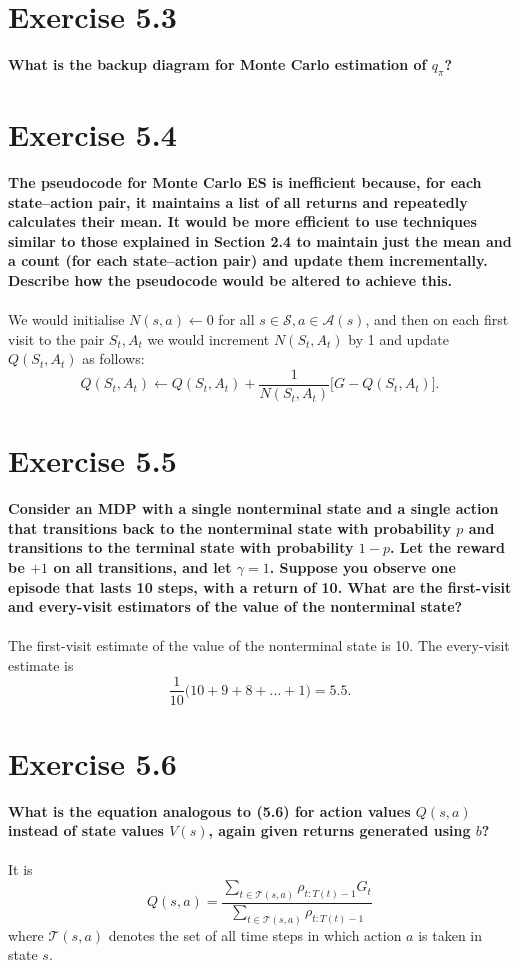 \documentclass[a4paper,11pt]{article}
\numberwithin{equation}{section}
\theoremstyle{remark}
\begin{document}
\section{Exercise 5.3}

\textbf{What is the backup diagram for Monte Carlo estimation of $q_\pi$?}

\section{Exercise 5.4}

\textbf{The pseudocode for Monte Carlo ES is inefficient because, for each state–action pair, it maintains a list of all returns and repeatedly calculates their mean. It would be more efficient to use techniques similar to those explained in Section 2.4 to maintain just the mean and a count (for each state–action pair) and update them incrementally. Describe how the pseudocode would be altered to achieve this.}
\\ \\
We would initialise $N(s, a) \gets 0$ for all $s \in \mathcal{S}, a \in \mathcal{A}(s)$, and then on each first visit to the pair $S_t, A_t$ we would increment $N(S_t, A_t)$ by 1 and update $Q(S_t, A_t)$ as follows:
\[
	Q(S_t, A_t) \gets Q(S_t, A_t) + \frac{1}{N(S_t, A_t)} \Big[G - Q(S_t, A_t)\Big].
\]

\section{Exercise 5.5}

\textbf{Consider an MDP with a single nonterminal state and a single action that transitions back to the nonterminal state with probability $p$ and transitions to the terminal state with probability $1 - p$. Let the reward be $+1$ on all transitions, and let $\gamma = 1$. Suppose you observe one episode that lasts 10 steps, with a return of 10. What are the first-visit and every-visit estimators of the value of the nonterminal state?}
\\ \\
The first-visit estimate of the value of the nonterminal state is 10. The every-visit estimate is
\[
	\frac{1}{10}\Big(10 + 9 + 8 + \dots + 1\Big) =  5.5.
\]

\section{Exercise 5.6}

\textbf{What is the equation analogous to (5.6) for action values $Q(s, a)$ instead of state values $V(s)$, again given returns generated using $b$?}
\\ \\
It is 
\[
	Q(s, a) = \frac{\sum_{t \in \mathcal{T}(s, a)} \rho_{t:T(t) - 1} G_t}{{\sum_{t \in \mathcal{T}(s, a)} \rho_{t:T(t) - 1}}}
\]
where $\mathcal{T}(s, a)$ denotes the set of all time steps in which action $a$ is taken in state $s$.
\end{document}
